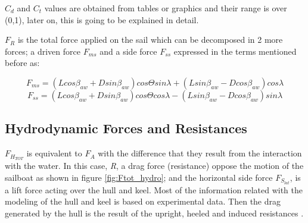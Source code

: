 $C_{d}$ and $C_{t}$ values are obtained from tables or graphics and their range is over (0,1), later on, this is going to be explained in detail. \par 
$F_{R}$ is the total force applied on the sail which can be decomposed in 2 more forces; a driven force $F_{ms}$ and a side force $F_{ss}$ expressed in the terms mentioned before as:\par
\begin{equation}\label{eq:drive_sail_force}
    F_{ms}= (L cos \beta_{aw}+ D sin \beta_{aw})cos \Theta sin \lambda + (L sin \beta_{aw}-D cos\beta_{aw})cos \lambda
\end{equation}
\begin{equation}\label{eq:side_sail_force}
    F_{ss}=(L cos \beta_{aw}+ D sin \beta_{aw})cos \Theta cos \lambda - (L sin \beta_{aw}-D cos\beta_{aw})sin \lambda
\end{equation}
\subsection {Hydrodynamic Forces and Resistances} \label{sec:hydroforces}
$F_{H_{TOT}}$ is equivalent to $F_{A}$ with the difference that they result from the interaction with the water. In this case, \textit{R}, a drag force (resistance) oppose the motion of the sailboat as shown in figure \ref{fig:Ftot_hydro}; and the horizontal side force $F_{S_{lat}}$, is a lift force acting over the hull and keel. Most of the information related with the modeling of the hull and keel is based on experimental data. %
Then the drag generated by the hull is the result of the  upright, heeled and induced resistances \cite{philpott1993yacht}.\par


